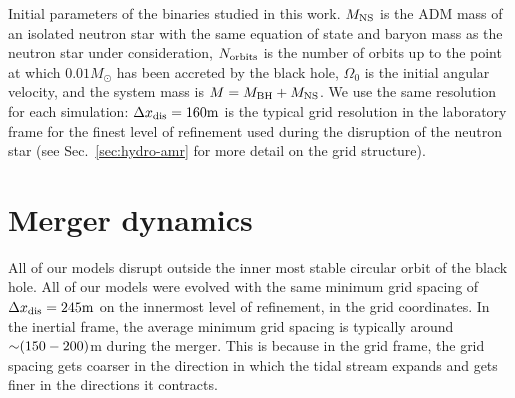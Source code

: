 \begin{table}
	\begin{center}
	\caption[Initial parameters of binaries used in this survey]{
		Initial parameters of the binaries studied in this work. 
		$M_{\rm NS}$ is the ADM mass of an isolated neutron star with the same equation of state and baryon mass as the neutron star under
		consideration, $N_{\rm orbits}$ is the number of orbits up to the point at which $0.01M_\odot$ has been accreted by the black hole,
		$\Omega_0$ is the initial angular velocity, and the system mass is $M=M_{\rm BH}+M_{\rm NS}$. We use the same resolution for each simulation: $\Delta x_{\rm dis} = 160{\rm m}$ is the typical grid resolution in the laboratory frame
		for the finest level of refinement used during the disruption of the neutron star (see Sec.~\ref{sec:hydro-amr} for more detail on the grid structure).}
	\label{tab:id}
	{
		
	}
	\end{center}
\end{table}


\section{Merger dynamics}
\label{sec:merger-dynamics}

All of our models disrupt outside the inner most stable circular orbit of the black hole.  
All of our models were evolved with the same minimum grid spacing of $\Delta x_{\rm dis} = 245{\rm m}$ on the innermost level of refinement, in the grid coordinates.  
In the inertial frame, the average minimum grid spacing is typically around $\mathord{\sim} (150-200)$m during the merger.  
This is because in the grid frame, the grid spacing gets coarser in the direction in which the tidal stream expands and gets finer in the directions it contracts.


